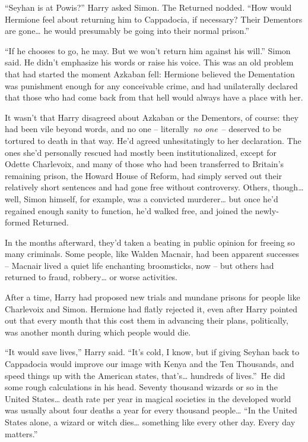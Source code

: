``Seyhan is at Powis?'' Harry asked Simon. The Returned nodded. ``How
would Hermione feel about returning him to Cappadocia, if necessary?
Their Dementors are gone\ldots{} he would presumably be going into their
normal prison.''

``If he chooses to go, he may. But we won't return him against his
will.'' Simon said. He didn't emphasize his words or raise his voice.
This was an old problem that had started the moment Azkaban fell:
Hermione believed the Dementation was punishment enough for any
conceivable crime, and had unilaterally declared that those who had come
back from that hell would always have a place with her.

It wasn't that Harry disagreed about Azkaban or the Dementors, of
course: they had been vile beyond words, and no one --
literally~\emph{no one}~-- deserved to be tortured to death in that way.
He'd agreed unhesitatingly to her declaration. The ones she'd personally
rescued had mostly been institutionalized, except for Odette Charlevoix,
and many of those who had been transferred to Britain's remaining
prison, the Howard House of Reform, had simply served out their
relatively short sentences and had gone free without controversy.
Others, though\ldots{} well, Simon himself, for example, was a convicted
murderer\ldots{} but once he'd regained enough sanity to function, he'd
walked free, and joined the newly-formed Returned.

In the months afterward, they'd taken a beating in public opinion for
freeing so many criminals. Some people, like Walden Macnair, had been
apparent successes -- Macnair lived a quiet life enchanting broomsticks,
now -- but others had returned to fraud, robbery\ldots{} or worse
activities.

After a time, Harry had proposed new trials and mundane prisons for
people like Charlevoix and Simon. Hermione had flatly rejected it, even
after Harry pointed out that every month that this cost them in
advancing their plans, politically, was another month during which
people would die.

``It would save lives,'' Harry said. ``It's cold, I know, but if giving
Seyhan back to Cappadocia would improve our image with Kenya and the Ten
Thousands, and speed things up with the American states, that's\ldots{}
hundreds of lives.''~He did some rough calculations in his head. Seventy
thousand wizards or so in the United States\ldots{} death rate per year
in magical societies in the developed world was usually about four
deaths a year for every thousand people\ldots{} ``In the United States
alone, a wizard or witch dies\ldots{} something like every other day.
Every day matters.''

